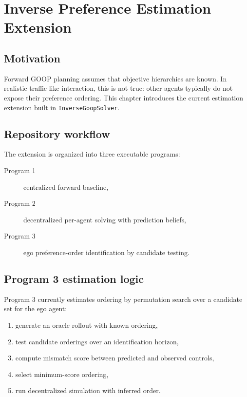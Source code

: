 \chapter{Inverse Preference Estimation Extension}

\section{Motivation}

Forward GOOP planning assumes that objective hierarchies are known. In realistic
traffic-like interaction, this is not true: other agents typically do not expose
their preference ordering. This chapter introduces the current estimation
extension built in \texttt{InverseGoopSolver}.

\section{Repository workflow}

The extension is organized into three executable programs:

\begin{description}
    \item[Program 1] centralized forward baseline,
    \item[Program 2] decentralized per-agent solving with prediction beliefs,
    \item[Program 3] ego preference-order identification by candidate testing.
\end{description}

\section{Program 3 estimation logic}

Program 3 currently estimates ordering by permutation search over a candidate
set for the ego agent:

\begin{enumerate}
    \item generate an oracle rollout with known ordering,
    \item test candidate orderings over an identification horizon,
    \item compute mismatch score between predicted and observed controls,
    \item select minimum-score ordering,
    \item run decentralized simulation with inferred order.
\end{enumerate}

